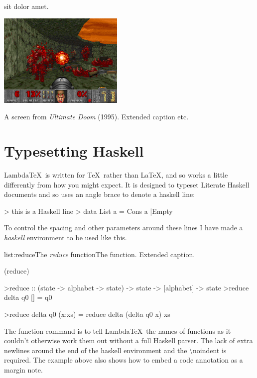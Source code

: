 
 sit dolor amet.
\lipsum[2-3]

\begin{marginfigure}
	\includegraphics[width=6cm]{res/doom/doom.png}
	\caption[A screen from \emph{Ultimate Doom}.]{A screen from \emph{Ultimate Doom} (1995). Extended caption etc.}
	\label{fig:doom}
\end{marginfigure}

\lipsum[4]

\section{Typesetting Haskell}

Lambda\TeX\ is written for \TeX\ rather than \LaTeX, and so works a little differently from how you might expect. It is designed to typeset Literate Haskell documents and so uses an angle brace to denote a haskell line:

> this is a Haskell line
> data List a = Cons a |Empty

To control the spacing and other parameters around these lines I have made a \emph{haskell} environment to be used like this.

\vspace{-0.5em}
\begin{listing}{list:reduce}{The \emph{reduce} function}{The  function. Extended caption.}{}
\end{listing}\vspace{-1.5em}

\functions(reduce)
\begin{haskell}
>reduce :: (state -> alphabet -> state) -> state -> [alphabet] -> state
>reduce delta q0 []     = q0

\vspace{-1.7em}
>reduce delta q0 (x:xs) = reduce delta (delta q0 x) xs

\end{haskell}
\noindent
The function command is to tell Lambda\TeX\ the names of functions as it couldn't otherwise work them out without a full Haskell parser. The lack of extra newlines around the end of the haskell environment and the \textbackslash noindent is required. The example above also shows how to embed a code annotation as a margin note. 

